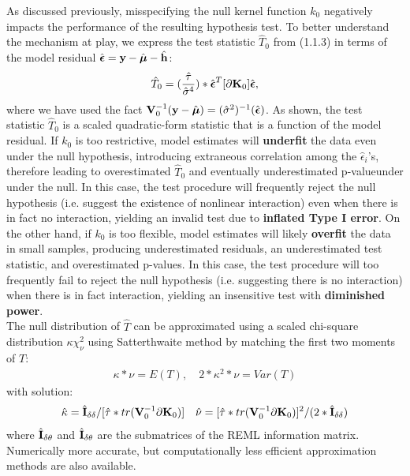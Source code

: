 \documentclass[11pt]{article}
\begin{document}
As discussed previously, misspecifying the null kernel function $k_0$ negatively impacts the performance of the resulting hypothesis test. To better understand the mechanism at play, we express the test statistic $\hat{T}_0$ from (1.1.3) in terms of the model residual $\hat{\boldsymbol{\epsilon}}={\bf y}-\hat{\boldsymbol{\mu}}-\hat{{\bf h}}$:
\begin{align}
\hat{T}_0=(\frac{\hat{\tau}}{\hat{\sigma}^4})*\hat{\boldsymbol{\epsilon}}^T[\partial {\bf K}_0]\hat{\boldsymbol{\epsilon}},
\end{align}
where we have used the fact ${\bf V}_0^{-1}({\bf y}-\hat{\boldsymbol{\mu}})=(\hat{\sigma}^2)^{-1}(\hat{\boldsymbol{\epsilon}})$. As shown, the test statistic $\hat{T}_0$ is a scaled quadratic-form statistic that is a function of the model residual. If $k_0$ is too restrictive, model estimates will \textbf{underfit} the data even under the null hypothesis, introducing extraneous correlation among the $\hat{\epsilon}_i$'s, therefore leading to overestimated $\hat{T}_0$ and eventually underestimated p-valueunder under the null. In this case, the test procedure will frequently reject the null hypothesis (i.e. suggest the existence of nonlinear interaction) even when there is in fact no interaction, yielding an invalid test due to \textbf{inflated Type I error}. On the other hand, if $k_0$ is too flexible, model estimates will likely \textbf{overfit} the data in small samples, producing underestimated residuals, an underestimated test statistic, and overestimated p-values. In this case, the test procedure will too frequently fail to reject the null hypothesis (i.e. suggesting there is no interaction) when there is in fact interaction, yielding an insensitive test with \textbf{diminished power}.\\
The null distribution of $\hat{T}$ can be approximated using a scaled chi-square distribution $\kappa \chi_\nu^2$ using Satterthwaite method by matching the first two moments of $T$:
\begin{align*}
\kappa * \nu=E(T), \quad 2*\kappa^2*\nu=Var(T)
\end{align*}
with solution:
\begin{align*}
\hat{\kappa}=\hat{{\bf I}}_{\delta\delta}/[\hat{\tau}*tr({\bf V}_0^{-1}\partial {\bf K}_0)] \quad \hat{\nu}=[\hat{\tau}*tr({\bf V}_0^{-1}\partial {\bf K}_0)]^2/(2*\hat{{\bf I}}_{\delta\delta})
\end{align*}
where $\hat{{\bf I}}_{\delta\theta}$ and $\hat{{\bf I}}_{\delta\theta}$ are the submatrices of the REML information matrix. Numerically more accurate, but computationally less efficient approximation methods are also available.\\
\end{document}

